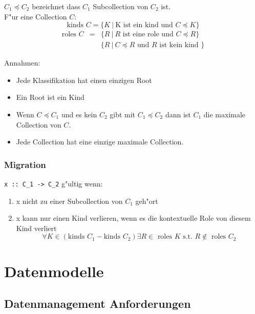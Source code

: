 \documentclass[german, 10pt, a4paper, twocolumn]{scrartcl}
\theoremstyle{definition}
\theoremstyle{remark}
\theoremstyle{example}
\begin{document}
$C_1 \preccurlyeq C_2$ bezeichnet dass $C_1$ Subcollection von $C_2$ ist.\\

F"ur eine Collection $C$:
\begin{displaymath}
	\text{kinds } C =  \{ K\ |\ \text{K ist ein kind und } C \preccurlyeq K\}
\end{displaymath}
\begin{eqnarray*}
	\text{roles } C &	= &	\{ R\ | \ R \text{ ist eine role und } C \preccurlyeq R\} \\
	&			&	\{ R\ | \ C \preccurlyeq R \text{ und } R \text{ ist kein kind }  \}
\end{eqnarray*}

Annahmen:
\begin{itemize}
	\item Jede Klassifikation hat einen einzigen Root
	\item Ein Root ist ein Kind
	\item Wenn $C \preccurlyeq C_1$ und es kein $C_2$ gibt mit $C_1 \preccurlyeq C_2$ dann ist $C_1$ die maximale Collection von $C$.
	\item Jede Collection hat eine einzige maximale Collection.
\end{itemize}

\subsubsection{Migration}

\verb#x :: C_1 -> C_2# g"ultig wenn:
\begin{enumerate}
	\item x nicht zu einer Subcollection von $C_1$ geh"ort
	\item x kann nur einen Kind verlieren, wenn es die kontextuelle Role von diesem Kind verliert
		\begin{displaymath}
			\forall K \in (\mbox{kinds } C_1 - \mbox{kinds } C_2) \exists R \in \mbox{ roles } K \mbox{ s.t. } R \not \in \mbox{ roles } C_2
		\end{displaymath}
\end{enumerate}



\section{Datenmodelle}

\subsection{Datenmanagement Anforderungen}
\end{document}
